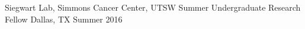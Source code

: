 \begin{cventries}

\cventry
{Siegwart Lab, Simmons Cancer Center, UTSW} %
{Summer Undergraduate Research Fellow} %
{Dallas, TX} %
{Summer 2016} %
{
  \begin{cvitems} %
    \item[] \hspace{-1em}{Synthesis and characterization of turn-on fluorescent probes for cancer diagnosis and imaging.}
  \end{cvitems}
}

\end{cventries}
